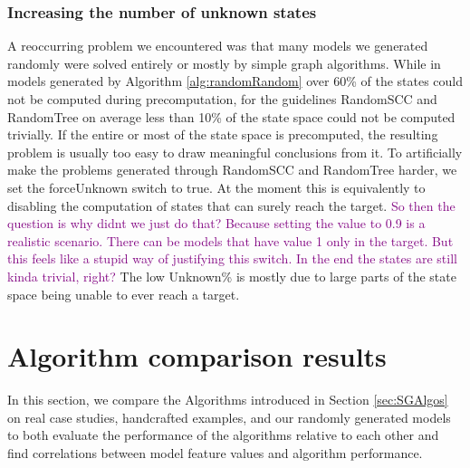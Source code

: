 \subsubsection*{Increasing the number of unknown states}
A reoccurring problem we encountered was that many models we generated randomly were solved entirely or mostly by simple graph algorithms.
While in models generated by Algorithm \ref{alg:randomRandom} over 60\% of the states could not be computed during precomputation, 
for the guidelines RandomSCC and RandomTree on average less than 10\% of the state space could not be computed trivially.
If the entire or most of the state space is precomputed, the resulting problem is usually too easy to draw meaningful conclusions from it.
To artificially make the problems generated through RandomSCC and RandomTree harder, we set the forceUnknown switch to true. 
At the moment this is equivalently to disabling the computation of 
states that can surely reach the target. \textcolor{purple}{So then the question is why didnt we just do that?
Because setting the value to 0.9 is a realistic scenario. There can be models that have value 1 only in the target. 
But this feels like a stupid way of justifying this switch. In the end the states are still kinda trivial, right?}
The low Unknown\% is mostly due to large parts of the state space being unable to ever reach a target.


\section{Algorithm comparison results}

In this section, we compare the Algorithms introduced in Section \ref{sec:SGAlgos} on real case studies, handcrafted examples, and our randomly generated models to both evaluate the 
performance of the algorithms relative to each other and find correlations between model feature values and algorithm performance.

